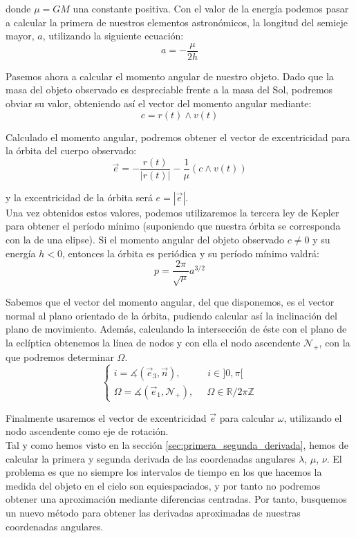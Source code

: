\noindent donde $\mu=GM$ una constante positiva. Con el valor de la energía podemos pasar a calcular la primera de nuestros elementos astronómicos, la longitud del semieje mayor, $a$, utilizando la siguiente ecuación:
\[
a=-\frac{\mu}{2h}
\]

Pasemos ahora a calcular el momento angular de nuestro objeto. Dado que la masa del objeto observado es despreciable frente a la masa del Sol, podremos obviar su valor, obteniendo así el vector del momento angular mediante:
\[
c=r(t)\wedge v(t)
\]

Calculado el momento angular, podremos obtener el vector de excentricidad para la órbita del cuerpo observado:
\[
\vec{e}=-\frac{r(t)}{|r(t)|}-\frac{1}{\mu}(c\wedge v(t))
\]

\noindent y la excentricidad de la órbita será $e=|\vec{e}|$.\\

Una vez obtenidos estos valores, podemos utilizaremos la tercera ley de Kepler para obtener el período mínimo (suponiendo que nuestra órbita se corresponda con la de una elipse). Si el momento angular del objeto observado $c\neq0$ y su energía $h<0$, entonces la órbita es periódica y su período mínimo valdrá:
\[
p=\frac{2\pi}{\sqrt{\mu}}a^{3/2}
\]

Sabemos que el vector del momento angular, del que disponemos, es el vector normal al plano orientado de la órbita, pudiendo calcular así la inclinación del plano de movimiento. Además, calculando la intersección de éste con el plano de la eclíptica obtenemos la línea de nodos y con ella el nodo ascendente $\mathcal{N}_+$, con la que podremos determinar $\Omega$.
\[
\left\{
\begin{array}{l}
	i=\measuredangle(\vec{e}_3,\vec{n}), \; \; \; \; \; \; \; \; \; \; i\in]0,\pi[\\
	\Omega=\measuredangle(\vec{e}_1, \mathcal{N}_+), \; \; \; \; \; \Omega\in\mathbb{R}/2\pi\mathbb{Z}
\end{array}
\right.
\]

Finalmente usaremos el vector de excentricidad $\vec{e}$ para calcular $\omega$, utilizando el nodo ascendente como eje de rotación.\\


\label{sec:series_potencias}
Tal y como hemos visto en la sección \ref{sec:primera_segunda_derivada}, hemos de calcular la primera y segunda derivada de las coordenadas angulares $\lambda$, $\mu$, $\nu$. El problema es que no siempre los intervalos de tiempo en los que hacemos la medida del objeto en el cielo son equiespaciados, y por tanto no podremos obtener una aproximación mediante diferencias centradas. Por tanto, busquemos un nuevo método para obtener las derivadas aproximadas de nuestras coordenadas angulares.\\

